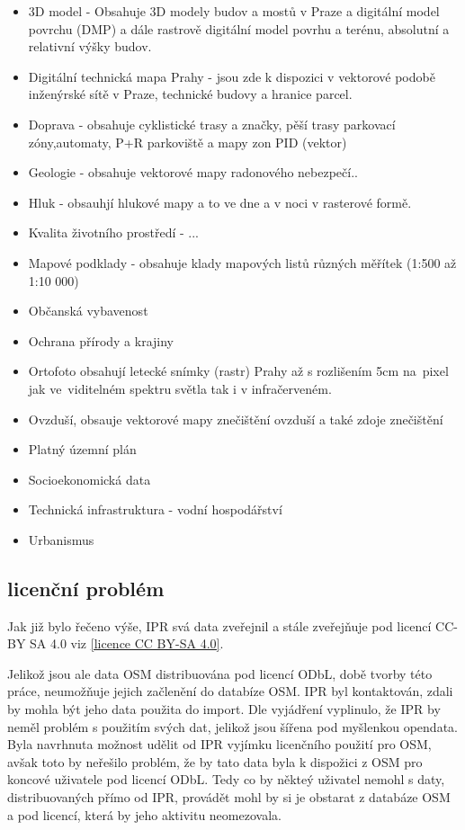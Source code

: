 \begin{itemize}
    \item   3D model - Obsahuje 3D modely budov a mostů v Praze a digitální
            model povrchu (DMP) a dále rastrově digitální model povrhu a
            terénu, absolutní a relativní výšky budov.
    \item   Digitální technická mapa Prahy - jsou zde k dispozici v vektorové
            podobě inženýrské sítě v Praze, technické budovy a hranice parcel.
    \item   Doprava - obsahuje cyklistické trasy a značky, pěší trasy
            parkovací zóny,automaty, P+R parkoviště a mapy zon PID (vektor)
    \item   Geologie - obsahuje vektorové mapy radonového nebezpečí..
    \item   Hluk - obsauhjí hlukové mapy a to ve dne a v noci v rasterové formě.
    \item   Kvalita životního prostředí - ...
    \item   Mapové podklady - obsahuje klady mapových listů
            různých měřítek (1:500 až 1:10 000)
    \item   Občanská vybavenost
    \item   Ochrana přírody a krajiny
    \item   Ortofoto obsahují letecké snímky (rastr) Prahy až s rozlišením 5cm
            na~pixel jak ve~viditelném spektru světla tak i v infračerveném.
    \item   Ovzduší, obsauje vektorové mapy znečištění ovzduší a také
            zdoje znečištění
    \item   Platný územní plán
    \item   Socioekonomická data
    \item   Technická infrastruktura - vodní hospodářství
    \item   Urbanismus
\end{itemize}




\subsection{licenční problém}
\label{licenční problém}
Jak již bylo řečeno výše, IPR svá data zveřejnil a stále zveřejňuje pod licencí CC-BY SA 4.0 viz \ref{licence CC BY-SA 4.0}.

Jelikož jsou ale data OSM distribuována pod licencí ODbL,
době tvorby této práce, neumožňuje jejich začlenění do databíze OSM.
IPR byl kontaktován, zdali by mohla být jeho data použita do import.
Dle vyjádření vyplinulo, že IPR by neměl problém s použitím svých dat, jelikož
jsou šířena pod myšlenkou opendata. Byla navrhnuta možnost udělit od IPR vyjímku
licenčního použití pro OSM, avšak toto by neřešilo problém, že by tato data byla
k dispožici z OSM pro koncové uživatele pod licencí ODbL. Tedy co by někteý
uživatel nemohl s daty, distribuovaných přímo od IPR, provádět mohl by si je
obstarat z databáze OSM a pod licencí, která by jeho aktivitu neomezovala.


